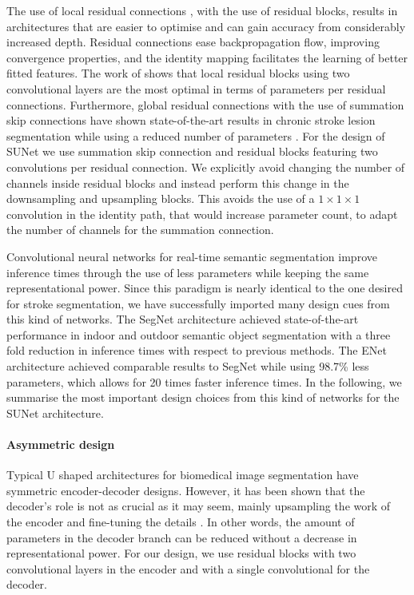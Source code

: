 \documentclass[letterpaper,final,authoryear,3p,times,twocolumn]{elsarticle}
\begin{document}
The use of local residual connections \citep{He}, with the use of residual blocks, results in architectures that are easier to optimise and can gain accuracy from considerably increased depth. Residual connections ease backpropagation flow, improving convergence properties, and the identity mapping facilitates the learning of better fitted features. The work of \cite{Zagoruyko2016} shows that local residual blocks using two convolutional layers are the most optimal in terms of parameters per residual connections. Furthermore, global residual connections with the use of summation skip connections have shown state-of-the-art results in chronic stroke lesion segmentation while using a reduced number of parameters \citep{Guerrero2018uresnet}. For the design of SUNet we use summation skip connection and residual blocks featuring two convolutions per residual connection. We explicitly avoid changing the number of channels inside residual blocks and instead perform this change in the downsampling and upsampling blocks. This avoids the use of a $1\times 1\times 1$ convolution in the identity path, that would increase parameter count, to adapt the number of channels for the summation connection.

Convolutional neural networks for real-time semantic segmentation improve inference times through the use of less parameters while keeping the same representational power. Since this paradigm is nearly identical to the one desired for stroke segmentation, we have successfully imported many design cues from this kind of networks. The SegNet architecture \citep{Badrinarayanan2015} achieved state-of-the-art performance in indoor and outdoor semantic object segmentation with a three fold reduction in inference times with respect to previous methods. The ENet architecture \citep{Paszke2016} achieved comparable results to SegNet while using 98.7\% less parameters, which allows for 20 times faster inference times. In the following, we summarise the most important design choices from this kind of networks for the SUNet architecture.

\paragraph{Asymmetric design} Typical U shaped architectures for biomedical image segmentation have symmetric encoder-decoder designs. However, it has been shown that the decoder's role is not as crucial as it may seem, mainly upsampling the work of the encoder and fine-tuning the details \citep{Paszke2016}. In other words, the amount of parameters in the decoder branch can be reduced without a decrease in representational power. For our design, we use residual blocks with two convolutional layers in the encoder and with a single convolutional for the decoder. 
\end{document}
